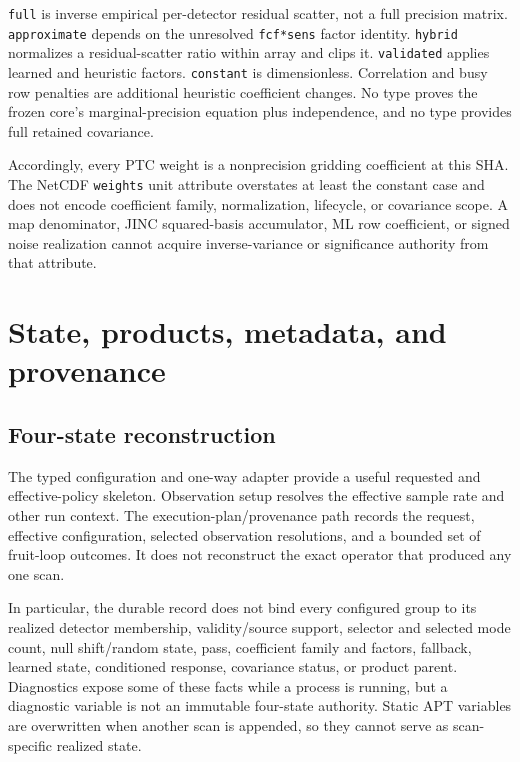 \documentclass[11pt]{article}
\newcommand{\code}[1]{\nolinkurl{#1}}
\begin{document}
\code{full} is inverse empirical per-detector residual scatter, not a full
precision matrix.  \code{approximate} depends on the unresolved
\code{fcf*sens} factor identity.  \code{hybrid} normalizes a residual-scatter
ratio within array and clips it.  \code{validated} applies learned and
heuristic factors.  \code{constant} is dimensionless.  Correlation and busy
row penalties are additional heuristic coefficient changes.  No type proves
the frozen core's marginal-precision equation plus independence, and no type
provides full retained covariance.

Accordingly, every PTC weight is a nonprecision gridding coefficient at this
SHA.  The NetCDF \code{weights} unit attribute overstates at least the
constant case and does not encode coefficient family, normalization,
lifecycle, or covariance scope.  A map denominator, JINC squared-basis
accumulator, ML row coefficient, or signed noise realization cannot acquire
inverse-variance or significance authority from that attribute.

\section{State, products, metadata, and provenance}

\subsection{Four-state reconstruction}

The typed configuration and one-way adapter provide a useful requested and
effective-policy skeleton.  Observation setup resolves the effective sample
rate and other run context.  The execution-plan/provenance path records the
request, effective configuration, selected observation resolutions, and a
bounded set of fruit-loop outcomes.  It does not reconstruct the exact
operator that produced any one scan.

In particular, the durable record does not bind every configured group to its
realized detector membership, validity/source support, selector and selected
mode count, null shift/random state, pass, coefficient family and factors,
fallback, learned state, conditioned response, covariance status, or product
parent.  Diagnostics expose some of these facts while a process is running,
but a diagnostic variable is not an immutable four-state authority.  Static
APT variables are overwritten when another scan is appended, so they cannot
serve as scan-specific realized state.
\end{document}

